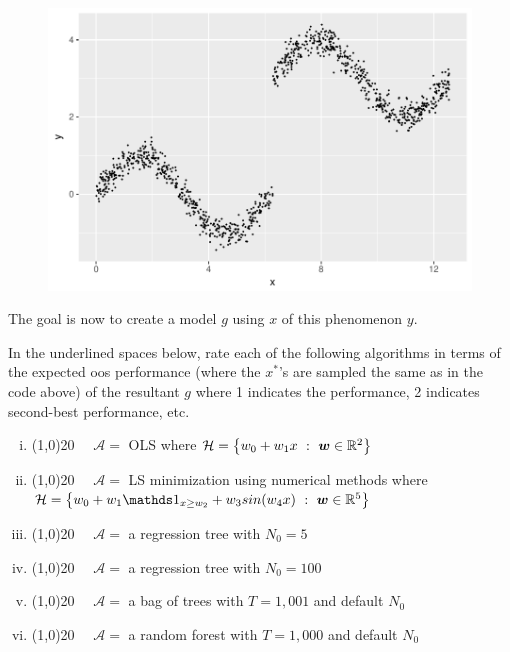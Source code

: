\documentclass[12pt]{article}
\begin{document}
\begin{figure}[h]
\centering\includegraphics[width=7in]{wiggly}
\end{figure}

\noindent The goal is now to create a model $g$ using $x$ of this phenomenon $y$.
\clearpage

\benum

 In the underlined spaces below, rate each of the following algorithms in terms of the expected oos performance (where the $x^*$'s are sampled the same as in the code above) of the resultant $g$ where 1 indicates the  performance, 2 indicates second-best performance, etc.

\begin{enumerate}[i)]
\item \line(1,0){20}~~ $\mathcal{A} =$ OLS where $\mathcal{H} = \left\{w_0 + w_1 x ~:~ \boldsymbol{w} \in \mathbb{R}^2\right\}$ 
\item \line(1,0){20}~~  $\mathcal{A} =$ LS minimization using numerical methods  where \\$\mathcal{H} = \braces{w_0 + w_1 \indic{x \geq w_2} + w_3 sin(w_4 x) ~:~ \w \in \reals^5}$
\item \line(1,0){20}~~  $\mathcal{A} =$ a regression tree with $N_0 = 5$
\item \line(1,0){20}~~  $\mathcal{A} =$ a regression tree with $N_0 = 100$
\item \line(1,0){20}~~  $\mathcal{A} =$ a bag of trees with $T=1,001$ and default $N_0$
\item \line(1,0){20}~~  $\mathcal{A} =$ a random forest with $T=1,000$ and default $N_0$
\end{enumerate}~\\
\end{document}
